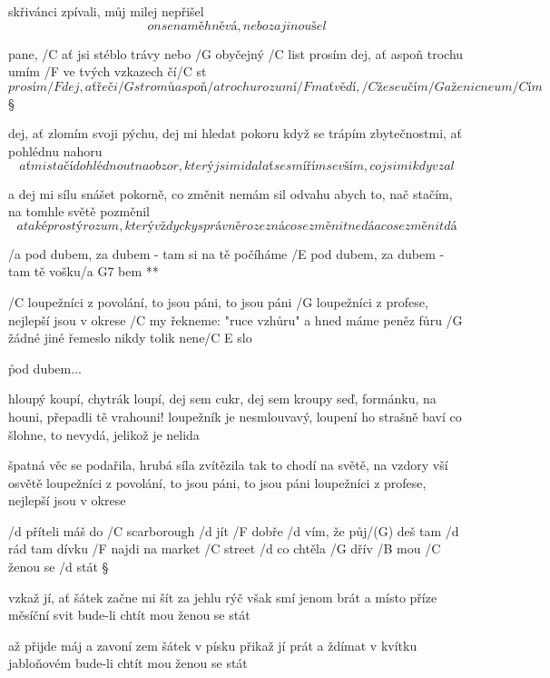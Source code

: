 skřivánci zpívali, můj milej nepřišel
\[ on se na mě hněvá, nebo za jinou šel \]




pane, /C ať jsi stéblo trávy nebo /G obyčejný /C list
prosím dej, ať aspoň trochu umím /F ve tvých vzkazech čí/C st
\[ prosím /F dej, ať řeči /G stromů aspoň /a trochu rozumí/F m
ať vědí, /C že se učím /G a že nic neum/C ím \] \S

dej, ať zlomím svoji pýchu, dej mi hledat pokoru
když se trápím zbytečnostmi, ať pohlédnu nahoru
\[ ať mi stačí dohlédnout na obzor, který jsi mi dal
ať se smířím se vším, co jsi mi kdy vzal \] \s

a dej mi sílu snášet pokorně, co změnit nemám sil
odvahu abych to, nač stačím, na tomhle světě pozměnil
\[ a také prostý rozum, který vždycky správně rozezná
co se změnit nedá a co se změnit dá \]



\R  /a pod dubem, za dubem - tam si na tě počíháme
    /E pod dubem, za dubem - tam tě vošku/{a G7} bem **

/C loupežníci z povolání, to jsou páni, to jsou páni
/G loupežníci z profese, nejlepší jsou v okrese
/C my řekneme: "ruce vzhůru" a hned máme peněz fůru
/G žádné jiné řemeslo nikdy tolik nene/{C E} slo

\r pod dubem...

hloupý koupí, chytrák loupí, dej sem cukr, dej sem kroupy
seď, formánku, na houni, přepadli tě vrahouni!
loupežník je nesmlouvavý, loupení ho strašně baví
co šlohne, to nevydá, jelikož je nelida

\rr

špatná věc se podařila, hrubá síla zvítězila
tak to chodí na světě, na vzdory vší osvětě
loupežníci z povolání, to jsou páni, to jsou páni
loupežníci z profese, nejlepší jsou v okrese




/d příteli máš do /C scarborough /d jít
/F dobře /d vím, že půj/(G) deš tam /d rád
tam dívku /F najdi na market /C street
/d co chtěla /G dřív /B mou /C ženou se /d stát \S

vzkaž jí, ať šátek začne mi šít
za jehlu rýč však smí jenom brát
a místo příze měsíční svit
bude-li chtít mou ženou se stát \s

až přijde máj a zavoní zem
šátek v písku přikaž jí prát
a ždímat v kvítku jabloňovém
bude-li chtít mou ženou se stát \s


